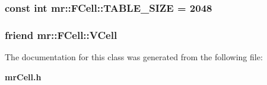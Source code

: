 \subsubsection{\setlength{\rightskip}{0pt plus 5cm}const int {\bf mr::FCell::TABLE\_\-SIZE} = 2048\hspace{0.3cm}{\tt  [static, protected]}}\label{classmr_1_1FCell_t0}


\subsubsection{\setlength{\rightskip}{0pt plus 5cm}friend {\bf mr::FCell::VCell}}\label{classmr_1_1FCell_o0}




The documentation for this class was generated from the following file:\begin{CompactItemize}
\item 
{\bf mr\-Cell.h}\end{CompactItemize}
